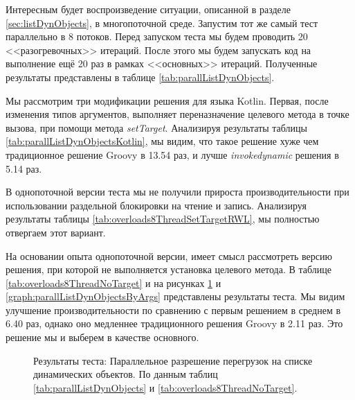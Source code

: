 Интересным будет воспроизведение ситуации, описанной в разделе \ref{sec:listDynObjects}, в многопоточной среде. Запустим тот же самый тест параллельно в 8 потоков. Перед запуском теста мы будем проводить 20 <<разогревочных>> итераций. После этого мы будем запускать код на выполнение ещё 20 раз в рамках <<основных>> итераций. Полученные результаты представлены в таблице \ref{tab:parallListDynObjects}. 


Мы рассмотрим три модификации решения для языка Kotlin. Первая, после изменения типов аргументов, выполняет переназначение целевого метода в точке вызова, при помощи метода \textit{setTarget}. Анализируя результаты таблицы \ref{tab:parallListDynObjectsKotlin}, мы видим, что такое решение хуже чем традиционное решение Groovy в 13.54 раз, и лучше \textit{invokedynamic} решения в 5.14 раз.

В однопоточной версии теста мы не получили прироста производительности при использовании раздельной блокировки на чтение и запись. Анализируя результаты таблицы \ref{tab:overloads8ThreadSetTargetRWL}, мы полностью отвергаем этот вариант.

На основании опыта однопоточной версии, имеет смысл рассмотреть версию решения, при которой не выполняется установка целевого метода. В таблице \ref{tab:overloads8ThreadNoTarget} и на рисунках \ref{graph:parallListDynObjects} и \ref{graph:parallListDynObjectsByArgs} представлены результаты теста. Мы видим улучшение производительности по сравнению с первым решением в среднем в 6.40 раз, однако оно медленнее традиционного решения Groovy в 2.11 раз. Это решение мы и выберем в качестве основного.

\begin{figure}
\caption{\label{graph:parallListDynObjects}Результаты теста: Параллельное разрешение перегрузок на списке динамических объектов. По данным таблиц \ref{tab:parallListDynObjects} и \ref{tab:overloads8ThreadNoTarget}.}
\end{figure}





